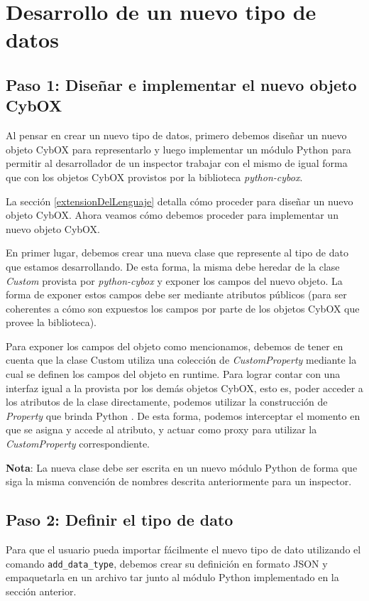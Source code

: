 \section{Desarrollo de un nuevo tipo de datos}
\label{nuevoTipoDeDatos}
\subsection*{Paso 1: Diseñar e implementar el nuevo objeto CybOX}
Al pensar en crear un nuevo tipo de datos, primero debemos diseñar un nuevo objeto CybOX para representarlo y luego implementar un módulo Python para permitir al desarrollador de un inspector trabajar con el mismo de igual forma que con los objetos CybOX provistos por la biblioteca \emph{python-cybox}.

La sección \ref{extensionDelLenguaje} detalla cómo proceder para diseñar un nuevo objeto CybOX. Ahora veamos cómo debemos proceder para implementar un nuevo objeto CybOX.

En primer lugar, debemos crear una nueva clase que represente al tipo de dato que estamos desarrollando. De esta forma, la misma debe heredar de la clase \emph{Custom} provista por \emph{python-cybox} y exponer los campos del nuevo objeto. La forma de exponer estos campos debe ser mediante atributos públicos (para ser coherentes a cómo son expuestos los campos por parte de los objetos CybOX que provee la biblioteca).

Para exponer los campos del objeto como mencionamos, debemos de tener en cuenta que la clase Custom utiliza una colección de \emph{CustomProperty} mediante la cual se definen los campos del objeto en runtime. Para lograr contar con una interfaz igual a la provista por los demás objetos CybOX, esto es, poder acceder a los atributos de la clase directamente, podemos utilizar la construcción de \emph{Property} que brinda Python \cite{python-property-class}. De esta forma, podemos interceptar el momento en que se asigna y accede al atributo, y actuar como proxy para utilizar la \emph{CustomProperty} correspondiente.

\textbf{Nota}: La nueva clase debe ser escrita en un nuevo módulo Python de forma que siga la misma convención de nombres descrita anteriormente para un inspector.

\subsection*{Paso 2: Definir el tipo de dato}
Para que el usuario pueda importar fácilmente el nuevo tipo de dato utilizando el comando \texttt{add\_data\_type}, debemos crear su definición en formato JSON y empaquetarla en un archivo tar junto al módulo Python implementado en la sección anterior.

